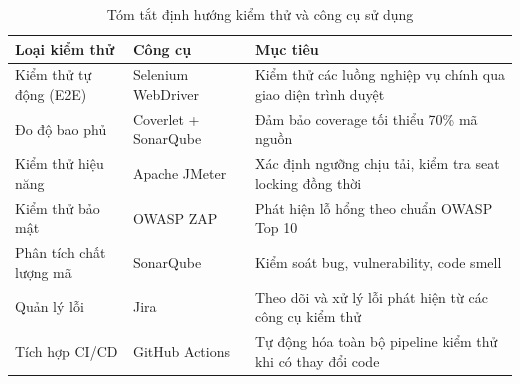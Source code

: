 \documentclass[../main.tex]{subfiles}
\begin{document}
\begin{table}[H]
\centering
\caption{Tóm tắt định hướng kiểm thử và công cụ sử dụng}
\label{tab:dinh-huong}
\begin{tabular}{|p{4cm}|p{3cm}|p{6cm}|}
\hline
\textbf{Loại kiểm thử} & \textbf{Công cụ} & \textbf{Mục tiêu} \\
\hline
Kiểm thử tự động (E2E) & Selenium WebDriver & Kiểm thử các luồng nghiệp vụ chính qua giao diện trình duyệt \\
\hline
Đo độ bao phủ & Coverlet + SonarQube & Đảm bảo coverage tối thiểu 70\% mã nguồn \\
\hline
Kiểm thử hiệu năng & Apache JMeter & Xác định ngưỡng chịu tải, kiểm tra seat locking đồng thời \\
\hline
Kiểm thử bảo mật & OWASP ZAP & Phát hiện lỗ hổng theo chuẩn OWASP Top 10 \\
\hline
Phân tích chất lượng mã & SonarQube & Kiểm soát bug, vulnerability, code smell \\
\hline
Quản lý lỗi & Jira & Theo dõi và xử lý lỗi phát hiện từ các công cụ kiểm thử \\
\hline
Tích hợp CI/CD & GitHub Actions & Tự động hóa toàn bộ pipeline kiểm thử khi có thay đổi code \\
\hline
\end{tabular}
\end{table}
\end{document}
